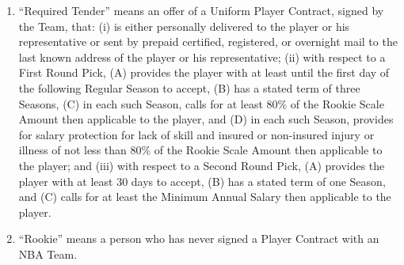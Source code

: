 \documentclass[
]{book}
\begin{document}
\begin{enumerate}
\item
  ``Required Tender'' means an offer of a Uniform Player Contract, signed by the Team, that: (i) is either personally delivered to the player or his representative or sent by prepaid certified, registered, or overnight mail to the last known address of the player or his representative; (ii) with respect to a First Round Pick, (A) provides the player with at least until the first day of the following Regular Season to accept, (B) has a stated term of three Seasons, (C) in each such Season, calls for at least 80\% of the Rookie Scale Amount then applicable to the player, and (D) in each such Season, provides for salary protection for lack of skill and insured or non-insured injury or illness of not less than 80\% of the Rookie Scale Amount then applicable to the player; and (iii) with respect to a Second Round Pick, (A) provides the player with at least 30 days to accept, (B) has a stated term of one Season, and (C) calls for at least the Minimum Annual Salary then applicable to the player.
\item
  ``Rookie'' means a person who has never signed a Player Contract with an NBA Team.


\end{enumerate}
\end{document}

